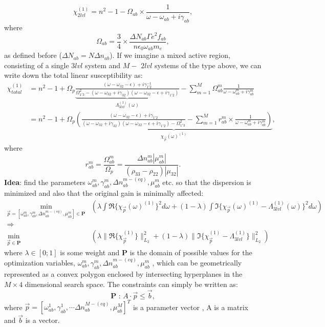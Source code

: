 \documentclass[10pt,letterpaper]{article}
\def\bm{\mathbf}
\begin{document}
	\begin{equation}
	\chi_{2lvl}^{(1)} = n^2-1-\Omega_{ab} \times \frac{1}{\omega - \omega_{ab} + i\gamma_{ab}},
	\end{equation}
	where
	$$\Omega_{ab} = \frac{3}{4}\times \frac{\Delta N_{ab}\Gamma e^2f_{ab}}{n\epsilon_0\omega_{ab}m_e},  $$
	as defined before ($\Delta N_{ab} = N \Delta n_{ab}$). If we imagine a mixed active region, consisting of a single $3lvl$ system and $M-$ $2lvl$ systems of the type above, we can write down the total linear susceptibility as:
	\begin{align}
	\label{eq:totalsusceptibility}
	\chi_{total}^{(1)} &= n^2-1 + \Omega_p \underbrace{\frac{(\omega-\omega_{32}-\epsilon)+i\gamma_{1'2}^{-1}}{\Omega_{1'3}^2-(\omega-\omega_{32}+i\gamma_{32})(\omega-\omega_{32}-\epsilon+i\gamma_{1'2})}}_{\Lambda_{3lvl}^{(1)}(\omega)} - \sum_{m=1}^{M} \Omega_{ab}^{m} \frac{1}{\omega - \omega_{ab}^{m} + i\gamma_{ab}^{m}} \nonumber \\
	&= n^2-1 + \Omega_p \underbrace{ \left  (\frac{(\omega-\omega_{32}-\epsilon)+i\gamma_{1'2} }{(\omega-\omega_{32}+i\gamma_{32})(\omega-\omega_{32}-\epsilon+i\gamma_{1'2})-\Omega_{1'3}^2} - \sum_{m=1}^{M} r_{ab}^{m}  \times \frac{1}{\omega - \omega_{ab}^{m} + i\gamma_{ab}^{m}} \right )}_{\chi_{\vec{p}}(\omega)^{(1)}},	
	\end{align}
	where 
	$$
	r_{ab}^{m} = \frac{\Omega_{ab}^{m}}{\Omega_p} = \frac{\Delta n_{ab}^{m} |\mu_{ab}^{m}|}{(\rho_{33}-\rho_{22})|\mu_{32}|}.
	$$
	\noindent
	\textbf{Idea}: find the parameters $\omega_{ab}^{m},\gamma_{ab}^{m}, \Delta n_{ab}^{m-(eq)},\mu_{ab}^{m}$ etc. so that the dispersion is minimized and also that the original gain is minimally affected: 
	\begin{align}
	\min_{\vec{p}=[\omega_{ab}^{m},\gamma_{ab}^{m}, \Delta n_{ab}^{m-(eq)},\mu_{ab}^{m}] \in \bm{P}} & \left ( \lambda \int{\Re\{\chi_{\vec{p}}(\omega)^{(1)}\}^2 d\omega} + (1-\lambda)\int{ \Im\{\chi_{\vec{p}}(\omega)^{(1)} - \Lambda_{3lvl}^{(1)}(\omega)\}^2 d\omega} \right ) \nonumber \\
	\Rightarrow \nonumber \\
	\min_{ {\vec{p}} \in \bm{P}} & \left ( \lambda \|\Re\{\chi_{\vec{p}}^{(1)}\}\|_{L_2}^2  + (1-\lambda)\| \Im\{\chi_{\vec{p}}^{(1)} - \Lambda_{3lvl}^{(1)}\}\|_{L_2}^2   \right )
	\end{align}
	where $\lambda \in [0;1]$ is some weight and $\bm{P}$ is the domain of possible values for the optimization variables,  $\omega_{ab}^{m},\gamma_{ab}^{m}, \Delta n_{ab}^{m-(eq)},\mu_{ab}^{m}$ , which can be geometrically represented as a convex polygon enclosed by intersecting hyperplanes in the $M\times4$ dimensional search space. The constraints can simply be written as:
	$$
	\bm{P} \text{ : }  A\cdot \vec{p} \leq \vec{b},
	$$
	where $\vec{p} = [\omega_{ab}^{1},\gamma_{ab}^{1},\cdots \Delta n_{ab}^{M-(eq)},\mu_{ab}^{M}]^T$ is a parameter vector , A is a matrix and $\vec{b}$ is a vector.  
	
	
	
	
	
	
\end{document}
